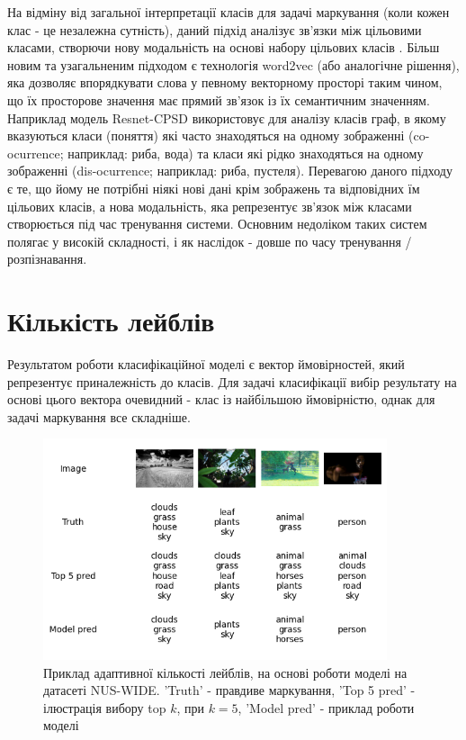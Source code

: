 \documentclass{udstu}
\begin{document}
\begin{enumerate}
	На відміну від загальної інтерпретації класів для задачі маркування
	(коли кожен клас - це незалежна сутність), даний підхід аналізує зв'язки між цільовими класами,
	створючи нову модальність на основі набору цільових класів \cite{srn}.
	Більш новим та узагальненим підходом є технологія word2vec (або аналогічне рішення), яка дозволяє
	впорядкувати слова у певному векторному просторі таким чином, що їх просторове значення має
	прямий зв'язок із їх семантичним значенням. Наприклад модель Resnet-CPSD \cite{cpsd} використовує для аналізу класів
	граф, в якому вказуються класи (поняття) які часто знаходяться на одному зображенні
	(co-ocurrence; наприклад: риба, вода) та класи які рідко знаходяться
	на одному зображенні (dis-ocurrence; наприклад: риба, пустеля).
	Перевагою даного підходу є те, що йому не потрібні ніякі нові дані крім зображень та
	відповідних їм цільових класів, а нова модальність, яка репрезентує зв'язок між класами
	створюється під час тренування системи. Основним недоліком таких систем полягає у
	високій складності, і як наслідок - довше по часу тренування / розпізнавання.
\end{enumerate}

\clearpage

\section{Кількість лейблів}

Результатом роботи класифікаційної моделі є вектор ймовірностей, який репрезентує приналежність до класів.
Для задачі класифікації вибір результату на основі цього вектора очевидний - клас із найбільшою ймовірністю, однак
для задачі маркування все складніше.

\begin{figure}[!ht]
	\centering
	\includegraphics[width=0.9\textwidth]{PNG/test-topk-144}
	\caption{
	Приклад адаптивної кількості лейблів,
	на основі роботи моделі на датасеті NUS-WIDE.
	'Truth' - правдиве маркування,
	'Top 5 pred' - ілюстрація вибору top $k$, при $k=5$,
	'Model pred' - приклад роботи моделі
	}
	\label{figure:test-topk}
\end{figure}
\end{document}

